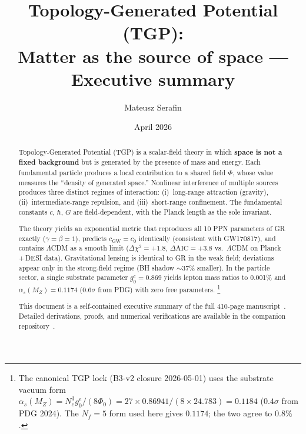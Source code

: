 \documentclass[11pt,a4paper]{article}
\begin{document}
\title{%
  \textbf{Topology-Generated Potential (TGP):}\\[4pt]
  \large Matter as the source of space --- Executive summary%
}
\author{Mateusz Serafin}
\date{April 2026}
\maketitle

\begin{abstract}
Topology-Generated Potential (TGP) is a scalar-field theory in which
\textbf{space is not a fixed background} but is generated by the presence
of mass and energy.  Each fundamental particle produces a local
contribution to a shared field $\Phi$, whose value measures the ``density
of generated space.''  Nonlinear interference of multiple sources produces
three distinct regimes of interaction: (i)~long-range attraction
(gravity), (ii)~intermediate-range repulsion, and (iii)~short-range
confinement.  The fundamental constants $c$, $\hbar$, $G$ are
field-dependent, with the Planck length as the sole invariant.

The theory yields an exponential metric that reproduces all 10 PPN
parameters of GR exactly ($\gamma = \beta = 1$), predicts
$c_{\mathrm{GW}} = c_0$ identically (consistent with GW170817), and
contains $\Lambda$CDM as a smooth limit ($\Delta\chi^2 = +1.8$,
$\Delta\mathrm{AIC} = +3.8$ vs.\ $\Lambda$CDM on Planck\,+\,DESI data).
Gravitational lensing is identical to GR in the weak field; deviations
appear only in the strong-field regime (BH shadow $\sim$37\% smaller).
In the particle sector, a single substrate parameter $g_0^e = 0.869$
yields lepton mass ratios to 0.001\% and $\alpha_s(M_Z) = 0.1174$
($0.6\sigma$ from PDG) with zero free parameters.%
\footnote{The canonical TGP lock (B3-v2 closure 2026-05-01) uses the
substrate vacuum form $\alpha_s(M_Z) = N_c^3 g_0^e / (8\Phi_0) =
27 \times 0.86941 / (8 \times 24.783) = 0.1184$ ($0.4\sigma$ from PDG
2024). The $N_f = 5$ form used here gives $0.1174$; the two agree to
$0.8\%$.}

This document is a self-contained executive summary of the full
410-page manuscript~\cite{Serafin2026-full}.  Detailed derivations,
proofs, and numerical verifications are available in the companion
repository~\cite{TGP-repo}.
\end{abstract}

\tableofcontents
\newpage













\end{document}

